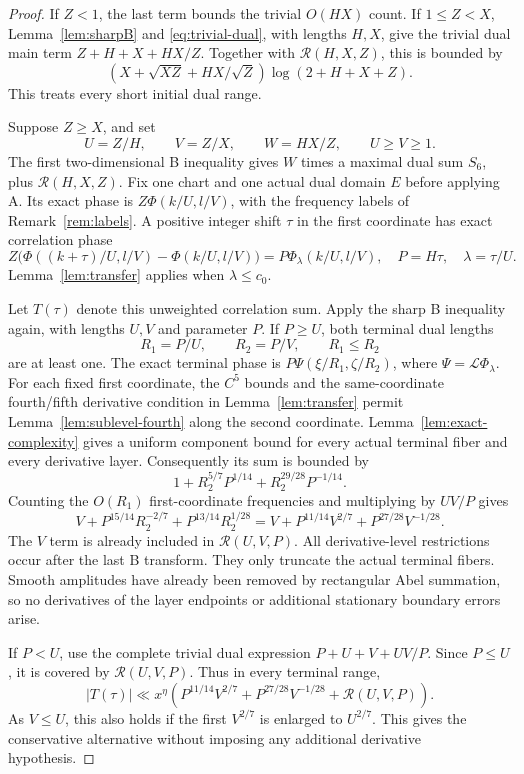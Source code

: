 \documentclass[11pt,a4paper]{article}
\numberwithin{equation}{section}
\theoremstyle{remark}
\newcommand{\Leg}{\mathcal L}
\begin{document}
\begin{proof}
If $Z<1$, the last term bounds the trivial $O(HX)$ count. If $1\le Z<X$,
Lemma~\ref{lem:sharpB} and \eqref{eq:trivial-dual}, with lengths $H,X$,
give the trivial dual main term $Z+H+X+HX/Z$. Together with
$\mathcal R(H,X,Z)$, this is bounded by
\[
 (X+\sqrt{XZ}+HX/\sqrt Z)\log(2+H+X+Z).
\]
This treats every short initial dual range.

Suppose $Z\ge X$, and set
\begin{equation}\label{eq:UVW}
 U=Z/H,\qquad V=Z/X,\qquad W=HX/Z,\qquad U\ge V\ge1.
\end{equation}
The first two-dimensional B inequality gives $W$ times a maximal dual sum
$S_6$, plus $\mathcal R(H,X,Z)$. Fix one chart and one actual dual domain
$E$ before applying A. Its exact phase is $Z\Phi(k/U,l/V)$, with the
frequency labels of Remark~\ref{rem:labels}. A positive integer shift
$\tau$ in the first coordinate has exact correlation phase
\[
 Z\bigl(\Phi((k+\tau)/U,l/V)-\Phi(k/U,l/V)\bigr)
 =P\Phi_\lambda(k/U,l/V),\quad
 P=H\tau,\quad\lambda=\tau/U.
\]
Lemma~\ref{lem:transfer} applies when $\lambda\le c_0$.

Let $T(\tau)$ denote this unweighted correlation sum. Apply the sharp B
inequality again, with lengths $U,V$ and parameter $P$. If $P\ge U$,
both terminal dual lengths
\[
 R_1=P/U,\qquad R_2=P/V,\qquad R_1\le R_2
\]
are at least one. The exact terminal phase is
$P\Psi(\xi/R_1,\zeta/R_2)$, where $\Psi=\Leg\Phi_\lambda$.
For each fixed first coordinate, the $C^5$ bounds and the
same-coordinate fourth/fifth derivative condition in
Lemma~\ref{lem:transfer} permit Lemma~\ref{lem:sublevel-fourth} along
the second coordinate. Lemma~\ref{lem:exact-complexity} gives a uniform component bound for every
actual terminal fiber and every derivative layer. Consequently its sum is bounded by
\[
 1+R_2^{5/7}P^{1/14}+R_2^{29/28}P^{-1/14}.
\]
Counting the $O(R_1)$ first-coordinate frequencies and multiplying by
$UV/P$ gives
\[
 V+P^{15/14}R_2^{-2/7}+P^{13/14}R_2^{1/28}
 =V+P^{11/14}V^{2/7}+P^{27/28}V^{-1/28}.
\]
The $V$ term is already included in $\mathcal R(U,V,P)$.
All derivative-level restrictions occur after the last B transform.
They only truncate the actual terminal fibers. Smooth amplitudes have
already been removed by rectangular Abel summation, so no derivatives
of the layer endpoints or additional stationary boundary errors arise.

If $P<U$, use the complete trivial dual expression
$P+U+V+UV/P$. Since $P\le U$, it is covered by $\mathcal R(U,V,P)$.
Thus in every terminal range,
\begin{equation}\label{eq:terminal}
 |T(\tau)|\ll x^\eta\left(
 P^{11/14}V^{2/7}+P^{27/28}V^{-1/28}
 +\mathcal R(U,V,P)\right).
\end{equation}
As $V\le U$, this also holds if the first $V^{2/7}$ is enlarged to
$U^{2/7}$. This gives the conservative alternative without imposing
any additional derivative hypothesis.


\end{proof}
\end{document}
